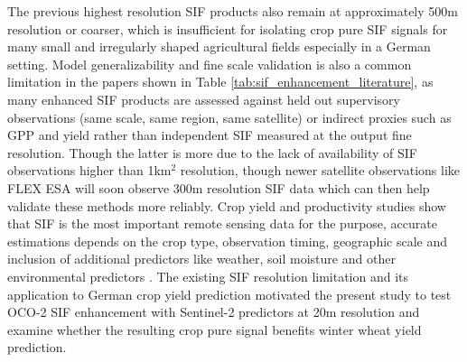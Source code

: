 The previous highest resolution SIF products also remain at approximately 500m resolution or coarser, which is insufficient for  isolating crop pure SIF signals for many small and irregularly shaped agricultural fields especially in a German setting. Model generalizability and fine scale validation is also a common limitation in the papers shown in Table \ref{tab:sif_enhancement_literature}, as many enhanced SIF products are assessed against held out supervisory observations (same scale, same region, same satellite) or indirect proxies such as GPP and yield rather than independent SIF measured at the output fine resolution. Though the latter is more due to the lack of availability of SIF observations higher than 1km$^2$ resolution, though newer satellite observations like FLEX ESA \cite{drusch2016fluorescence, coppo2017fluorescence} will soon observe 300m resolution SIF data which can then help validate these methods more reliably. Crop yield and productivity studies show that SIF is the most important remote sensing data for the purpose, accurate estimations depends on the crop type, observation timing, geographic scale and inclusion of additional predictors like weather, soil moisture and other environmental predictors \cite{peng2020assessing,song2018satellite,qiu2022monitoring}. The existing SIF resolution limitation and its application to German crop yield prediction motivated the present study to test OCO-2 SIF enhancement with Sentinel-2 predictors at 20m resolution and examine whether the resulting crop pure signal benefits winter wheat yield prediction. 

